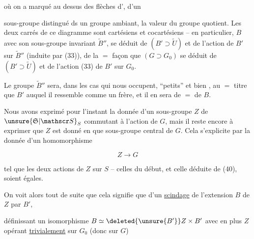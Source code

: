où on a marqué au dessus des flèches d', d'un


sous-groupe distingué ds un groupe ambiant, la valeur du groupe quotient. Les deux carrés de ce diagramme sont cartésiens et cocartésiens -- en particulier, $B$ avec son sous-groupe invariant  $\widetilde B''$, se déduit de $(B'\supset\widetilde U)$ et de l'action de $B'$ sur $\widetilde B''$ (induite par (33)), de la $=$ façon que $(G\supset G_0)$ se déduit de $(B'\supset\widetilde U)$ et de l'action (33) de $B'$ sur $G_0$.

Le groupe $\widetilde B''$  sera, dans les cas qui nous occupent, ``petits'' et bien  , au $=$ titre que $B'$ auquel il ressemble comme un frère, et il en sera de $=$ de $B$.

Nous avons exprimé pour l'instant  la donnée d'un sous-groupe $Z$ de $\unsure{\mathfrak S|\mathscr S}_S$ commutant à l'action de $G$, mais il reste encore à exprimer que $Z$ est donné en  que sous-groupe central de $G$. Cela s'explicite par la donnée d'un homomorphisme 

\[ Z\longrightarrow G \tag*{(40)} \]

tel que les deux actions de $Z$ sur $S$ -- celles du début, et celle déduite de (40), soient égales.

On voit alors tout de suite que cela signifie que   d'un \uline{scindage}   de l'extension $B$ de $Z$ par $B'$, 


définissant  un isomorphisme $B\simeq\deleted{\unsure{B'}}Z\times B'$ avec en plus $Z$ opérant \uline{trivialement} sur $G_0$ (donc sur $G$)

